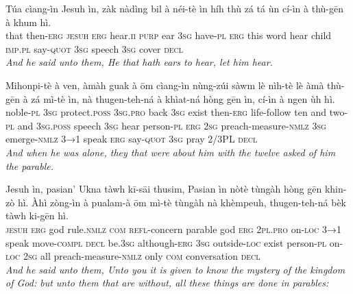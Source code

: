 \documentclass[11pt,a4paper]{article}
\begin{document}
\begin{exe}
\gll Túa cìang-ìn Jesuh ìn, zàk nàdìng bil à néi-tè ìn híh thù zá tá ùn cí-ìn à thù-gēn à khum hì. \\
     that then-\textsc{erg} \textsc{jesuh} \textsc{erg} hear.\textsc{ii} \textsc{purp} ear \textsc{3sg} have-\textsc{pl} \textsc{erg} this word hear child \textsc{imp}.\textsc{pl} say-\textsc{quot} \textsc{3sg} speech \textsc{3sg} cover \textsc{decl} \\
\glt \textcolor{kjvcolor}{\textit{And he said unto them, He that hath ears to hear, let him hear.}}

\gll Mihonpi-tè à ven, àmàh guak à ōm cìang-ìn nùng-zúi sàwm lè nìh-tè lè àmà thù-gēn à zá mì-tè ìn, nà thugen-teh-ná à khìat-ná hòng gēn ìn, cí-ìn à ngen ùh hì. \\
     noble-\textsc{pl} \textsc{3sg} protect.\textsc{poss} \textsc{3sg}.\textsc{pro} back \textsc{3sg} exist then-\textsc{erg} life-follow ten and two-\textsc{pl} and \textsc{3sg}.\textsc{poss} speech \textsc{3sg} hear person-\textsc{pl} \textsc{erg} \textsc{2sg} preach-measure-\textsc{nmlz} \textsc{3sg} emerge-\textsc{nmlz} \textsc{3→1} speak \textsc{erg} say-\textsc{quot} \textsc{3sg} pray 2/3PL \textsc{decl} \\
\glt \textcolor{kjvcolor}{\textit{And when he was alone, they that were about him with the twelve asked of him the parable.}}

\gll Jesuh ìn, pasian' Ukna tàwh kī-sāi thusim, Pasian ìn nòtè tùngàh hòng gēn khin-zò hì. Àhì zòng-ìn à pualam-à ōm mì-tè tùngàh nà khèmpeuh, thugen-teh-ná bèk tàwh ki-gēn hì. \\
     \textsc{jesuh} \textsc{erg} god rule.\textsc{nmlz} \textsc{com} \textsc{refl}-concern parable god \textsc{erg} \textsc{2pl}.\textsc{pro} on-\textsc{loc} \textsc{3→1} speak move-\textsc{compl} \textsc{decl} be.\textsc{3sg} although-\textsc{erg} \textsc{3sg} outside-\textsc{loc} exist person-\textsc{pl} on-\textsc{loc} \textsc{2sg} all preach-measure-\textsc{nmlz} only \textsc{com} conversation \textsc{decl} \\
\glt \textcolor{kjvcolor}{\textit{And he said unto them, Unto you it is given to know the mystery of the kingdom of God: but unto them that are without, all these things are done in parables:}}


\end{exe}
\end{document}
